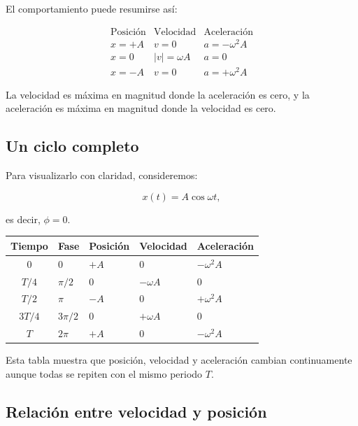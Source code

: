 \begin{interpretacion}
El comportamiento puede resumirse así:

\[
\begin{array}{c|c|c}
\text{Posición} & \text{Velocidad} & \text{Aceleración} \\ \hline
x=+A & v=0 & a=-\omega^2A \\
x=0 & |v|=\omega A & a=0 \\
x=-A & v=0 & a=+\omega^2A
\end{array}
\]

La velocidad es máxima en magnitud donde la aceleración es cero, y la aceleración es máxima en magnitud donde la velocidad es cero.
\end{interpretacion}

\subsection{Un ciclo completo}

Para visualizarlo con claridad, consideremos:

\[ x(t)=A\cos\omega t, \]

es decir, \(\phi=0\).

\begin{center}
\begin{tabularx}{0.95\textwidth}{cYYYY}
\toprule
\textbf{Tiempo} & \textbf{Fase} & \textbf{Posición} & \textbf{Velocidad} & \textbf{Aceleración} \\
\midrule
\(0\) & \(0\) & \(+A\) & \(0\) & \(-\omega^2A\) \\
\(T/4\) & \(\pi/2\) & \(0\) & \(-\omega A\) & \(0\) \\
\(T/2\) & \(\pi\) & \(-A\) & \(0\) & \(+\omega^2A\) \\
\(3T/4\) & \(3\pi/2\) & \(0\) & \(+\omega A\) & \(0\) \\
\(T\) & \(2\pi\) & \(+A\) & \(0\) & \(-\omega^2A\) \\
\bottomrule
\end{tabularx}
\end{center}

Esta tabla muestra que posición, velocidad y aceleración cambian continuamente aunque todas se repiten con el mismo periodo \(T\).

\subsection{Relación entre velocidad y posición}

